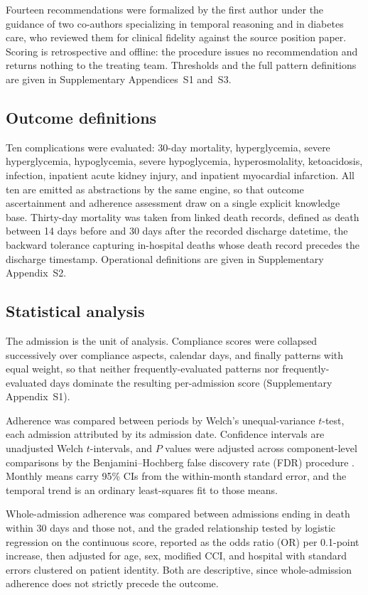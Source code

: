 Fourteen recommendations were formalized by the first author under the guidance
of two co-authors specializing in temporal reasoning and in diabetes care, who
reviewed them for clinical fidelity against the source position paper. Scoring
is retrospective and offline: the procedure issues no recommendation and
returns nothing to the treating team. Thresholds and the full pattern
definitions are given in Supplementary Appendices~S1 and~S3.

\subsection{Outcome definitions}

Ten complications were evaluated: 30-day mortality, hyperglycemia, severe
hyperglycemia, hypoglycemia, severe hypoglycemia, hyperosmolality,
ketoacidosis, infection, inpatient acute kidney injury, and inpatient
myocardial infarction. All ten are emitted as abstractions by the same engine,
so that outcome ascertainment and adherence assessment draw on a single
explicit knowledge base. Thirty-day mortality was taken from linked death
records, defined as death between 14 days before and 30 days after the recorded
discharge datetime, the backward tolerance capturing in-hospital deaths whose
death record precedes the discharge timestamp. Operational definitions are
given in Supplementary Appendix~S2.

\subsection{Statistical analysis}

The admission is the unit of analysis. Compliance scores were collapsed
successively over compliance aspects, calendar days, and finally patterns with
equal weight, so that neither frequently-evaluated patterns nor
frequently-evaluated days dominate the resulting per-admission score
(Supplementary Appendix~S1).

Adherence was compared between periods by Welch's unequal-variance $t$-test,
each admission attributed by its admission date. Confidence intervals are
unadjusted Welch $t$-intervals, and $P$ values were adjusted across
component-level comparisons by the Benjamini--Hochberg false discovery rate
(FDR) procedure \citep{benjamini1995controlling}. Monthly means carry 95\% CIs
from the within-month standard error, and the temporal trend is an ordinary
least-squares fit to those means.

Whole-admission adherence was compared between admissions ending in death
within 30 days and those not, and the graded relationship tested by logistic
regression on the continuous score, reported as the odds ratio (OR) per
0.1-point increase, then adjusted for age, sex, modified CCI, and hospital with
standard errors clustered on patient identity. Both are descriptive, since
whole-admission adherence does not strictly precede the outcome.

